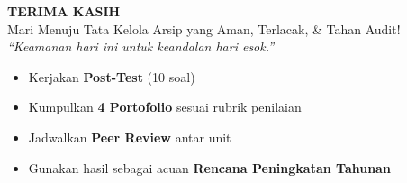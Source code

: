 \documentclass[aspectratio=169,11pt]{beamer}
\begin{document}
\begin{frame}{}
    \vspace{0.5cm}
    \begin{center}
        \huge \textcolor{plnblue}{\textbf{TERIMA KASIH}}\\[0.3cm]
        \large Mari Menuju Tata Kelola Arsip yang Aman, Terlacak, \& Tahan Audit!\\[0.6cm]
        \normalsize \textit{``Keamanan hari ini untuk keandalan hari esok.''}
    \end{center}
    \vspace{0.4cm}
    \begin{center}
        \begin{minipage}{0.65\textwidth}
            \begin{greenbox}
                \scriptsize
                \begin{itemize}
                    \item Kerjakan \textbf{Post-Test} (10 soal)
                    \item Kumpulkan \textbf{4 Portofolio} sesuai rubrik penilaian
                    \item Jadwalkan \textbf{Peer Review} antar unit
                    \item Gunakan hasil sebagai acuan \textbf{Rencana Peningkatan Tahunan}
                \end{itemize}
            \end{greenbox}
        \end{minipage}
    \end{center}
\end{frame}
\end{document}
